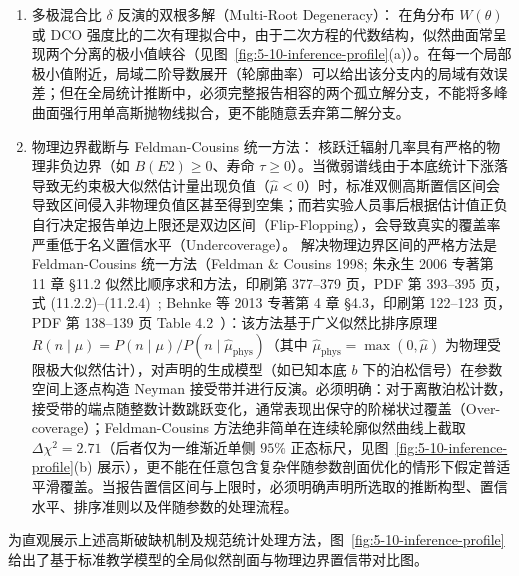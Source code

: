 \begin{enumerate}
\item 多极混合比 $\delta$ 反演的双根多解（Multi-Root Degeneracy）：
在角分布 $W(\theta)$ 或 DCO 强度比的二次有理拟合中，由于二次方程的代数结构，似然曲面常呈现两个分离的极小值峡谷（见图~\ref{fig:5-10-inference-profile}(a)）。在每一个局部极小值附近，局域二阶导数展开（轮廓曲率）可以给出该分支内的局域有效误差；但在全局统计推断中，必须完整报告相容的两个孤立解分支，不能将多峰曲面强行用单高斯抛物线拟合，更不能随意丢弃第二解分支。
\item 物理边界截断与 Feldman-Cousins 统一方法：
核跃迁辐射几率具有严格的物理非负边界（如 $B(E2) \ge 0$、寿命 $\tau \ge 0$）。当微弱谱线由于本底统计下涨落导致无约束极大似然估计量出现负值（$\widehat{\mu} < 0$）时，标准双侧高斯置信区间会导致区间侵入非物理负值区甚至得到空集；而若实验人员事后根据估计值正负自行决定报告单边上限还是双边区间（Flip-Flopping），会导致真实的覆盖率严重低于名义置信水平（Undercoverage）。
解决物理边界区间的严格方法是 Feldman-Cousins 统一方法（Feldman \& Cousins 1998; 朱永生 2006 专著第 11 章 §11.2 似然比顺序求和方法，印刷第 377--379 页，PDF 第 393--395 页，式 (11.2.2)--(11.2.4)~\cite{book-zhu-probability-statistics-in-physics}; Behnke 等 2013 专著第 4 章 §4.3，印刷第 122--123 页，PDF 第 138--139 页 Table 4.2~\cite{book-behnke-data-analysis-hep}）：该方法基于广义似然比排序原理 $R(n \mid \mu) = P(n \mid \mu) / P(n \mid \hat{\mu}_{\mathrm{phys}})$（其中 $\hat{\mu}_{\mathrm{phys}} = \max(0, \hat{\mu})$ 为物理受限极大似然估计），对声明的生成模型（如已知本底 $b$ 下的泊松信号）在参数空间上逐点构造 Neyman 接受带并进行反演。必须明确：对于离散泊松计数，接受带的端点随整数计数跳跃变化，通常表现出保守的阶梯状过覆盖（Over-coverage）；Feldman-Cousins 方法绝非简单在连续轮廓似然曲线上截取 $\Delta\chi^2 = 2.71$（后者仅为一维渐近单侧 $95\%$ 正态标尺，见图~\ref{fig:5-10-inference-profile}(b) 展示），更不能在任意包含复杂伴随参数剖面优化的情形下假定普适平滑覆盖。当报告置信区间与上限时，必须明确声明所选取的推断构型、置信水平、排序准则以及伴随参数的处理流程。
\end{enumerate}

为直观展示上述高斯破缺机制及规范统计处理方法，图~\ref{fig:5-10-inference-profile} 给出了基于标准教学模型的全局似然剖面与物理边界置信带对比图。

